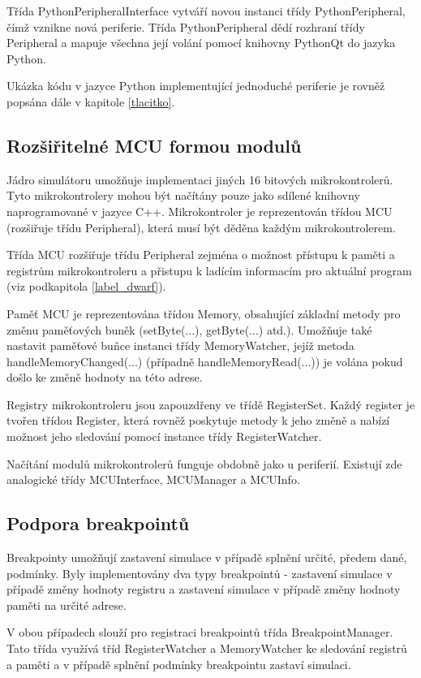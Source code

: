 Třída PythonPeripheralInterface vytváří novou instanci třídy PythonPeripheral, čímž vznikne nová periferie. Třída PythonPeripheral dědí rozhraní třídy Peripheral a mapuje všechna její volání pomocí knihovny PythonQt do jazyka Python.

Ukázka kódu v jazyce Python implementující jednoduché periferie je rovněž popsána dále v kapitole \ref{tlacitko}.

\subsection{Rozšiřitelné MCU formou modulů}

Jádro simulátoru umožňuje implementaci jiných 16 bitových mikrokontrolerů. Tyto mikrokontrolery mohou být načítány pouze jako sdílené knihovny naprogramované v jazyce C++. Mikrokontroler je reprezentován třídou MCU (rozšiřuje třídu Peripheral), která musí být děděna každým mikrokontrolerem.

Třída MCU rozšiřuje třídu Peripheral zejména o možnost přístupu k paměti a registrům mikrokontroleru a přistupu k ladícím informacím pro aktuální program (viz podkapitola \ref{label_dwarf}).

Paměť MCU je reprezentována třídou Memory, obsahující základní metody pro změnu paměťových buněk (setByte(...), getByte(...) atd.). Umožňuje také nastavit paměťové buňce instanci třídy MemoryWatcher, jejíž metoda handleMemoryChanged(...) (případně handleMemoryRead(...)) je volána pokud došlo ke změně hodnoty na této adrese.

Registry mikrokontroleru jsou zapouzdřeny ve třídě RegisterSet. Každý register je tvořen třídou Register, která rovněž poskytuje metody k jeho změně a nabízí možnost jeho sledování pomocí instance třídy RegisterWatcher.

Načítání modulů mikrokontrolerů funguje obdobně jako u periferií. Existují zde analogické třídy MCUInterface, MCUManager a MCUInfo.

\subsection{Podpora breakpointů}

Breakpointy umožňují zastavení simulace v případě splnění určité, předem dané, podmínky. Byly implementovány dva typy breakpointů - zastavení simulace v případě změny hodnoty registru a zastavení simulace v případě změny hodnoty paměti na určité adrese.

V obou případech slouží pro registraci breakpointů třída BreakpointManager. Tato třída využívá tříd RegisterWatcher a MemoryWatcher ke sledování registrů a paměti a v případě splnění podmínky breakpointu zastaví simulaci.

